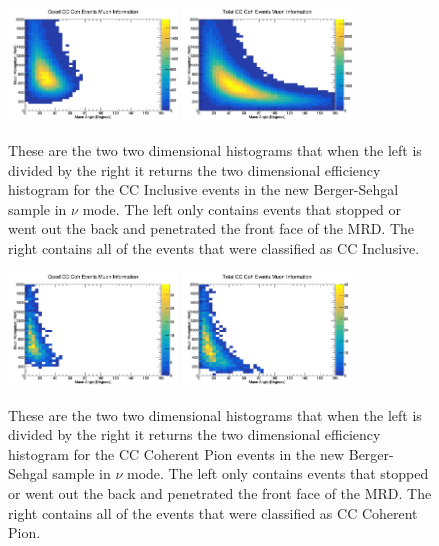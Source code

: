 \documentclass[11pt]{article}
\begin{document}
\begin{figure}[H]
\centering
\includegraphics[width=0.4\textwidth]{NewNMBergerSehgalImages/6-GoodCCCohMuonInfoNMBS.png}
\includegraphics[width=0.4\textwidth]{NewNMBergerSehgalImages/9-TotalCCCohMuonInfoNMBS.png}
\caption{These are the two two dimensional histograms that when the left is divided by the right it returns the two dimensional efficiency histogram for the CC Inclusive events in the new Berger-Sehgal sample in $\nu$ mode. The left only contains events that stopped or went out the back and penetrated the front face of the MRD. The right contains all of the events that were classified as CC Inclusive.}
\end{figure}

\begin{figure}[H]
\centering
\includegraphics[width=0.4\textwidth]{NewNMBergerSehgalImages/7.png}
\includegraphics[width=0.4\textwidth]{NewNMBergerSehgalImages/8.png}
\caption{These are the two two dimensional histograms that when the left is divided by the right it returns the two dimensional efficiency histogram for the CC Coherent Pion events in the new Berger-Sehgal sample in $\nu$ mode. The left only contains events that stopped or went out the back and penetrated the front face of the MRD. The right contains all of the events that were classified as CC Coherent Pion.}
\end{figure}
\end{document}

